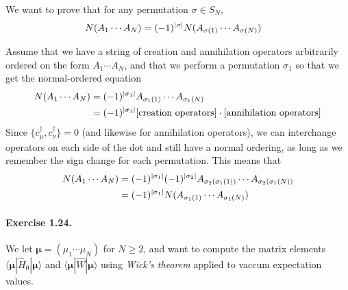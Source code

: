 \documentclass[12pt]{article}
\newcommand{\la}{\langle}
\newcommand{\ra}{\rangle}
\DeclarePairedDelimiter\abs{\lvert}{\rvert}%
\newcommand{\equ}[1]{{\begin{align}#1\end{align}}}
\renewcommand\vec[1]{\boldsymbol{\mathbf{#1}}} %
\newcommand{\op}[1]{\hat{#1}}
\newcommand{\da}{\dagger}
\begin{document}
\begin{itshape}
	We want to prove that for any permutation $\sigma \in S_N$,
    \equ{
        N(A_1\cdots A_N) &= (-1)^{\abs{\sigma}} 
        N(A_{\sigma(1)}\cdots A_{\sigma(N)})\label{eq:1.21.1}
    }
\end{itshape}
\begin{tcolorbox}[title = Exercise 1.21. // Solution, breakable]
Assume that we have a string of creation and annihilation operators
arbitrarily ordered on the form 
$A_1 \cdots A_N$,
and that we perform a permutation $\sigma_1$
so that we get the normal-ordered equation
\begin{align*}
    N(A_1\cdots A_N) 
    &= (-1)^{\abs{\sigma_1}}A_{\sigma_1(1)}\cdots A_{\sigma_1(N)}\\
    &= (-1)^{\abs{\sigma_1}}[\text{creation operators}]
    \cdot[\text{annihilation operators}]
\end{align*}
Since $\{c_{\mu}^\da, c_{\nu}^\da\} = 0$ (and likewise for annihilation operators),
we can interchange operators on each side of the dot
and still have a normal ordering, 
as long as we remember the sign change for each permutation.
This means that
\begin{align*}
	N(A_1\cdots A_N) &= (-1)^{\abs{\sigma_1}}(-1)^{\abs{\sigma_2}}
	A_{\sigma_2(\sigma_1(1))}\cdots A_{\sigma_2(\sigma_1(N))}\\
	&=(-1)^{\abs{\sigma_1}} N(A_{\sigma_1(1)} \cdots A_{\sigma_1(N)})
\end{align*}

\end{tcolorbox}

\paragraph{Exercise 1.24.}
\label{par:ex1.24}

\begin{itshape}
    We let $\vec\mu = (\mu_1\cdots \mu_N)$ for $N\geq 2$, 
    and want to compute the matrix elements $\la \vec\mu | \op H_0 | \vec\mu \ra$
    and $\la \vec\mu | \op W | \vec\mu \ra$ using \emph{Wick's theorem} applied to
    vaccum expectation values.
\end{itshape}\\
\end{document}

